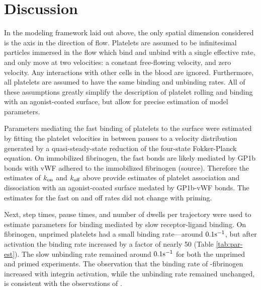 \documentclass{biophys-new}
\newcommand{\tn}{\textnormal}
\newcommand{\inv}{^{-1}}
\begin{document}
\section*{Discussion}

In the modeling framework laid out above, the only spatial dimension
considered is the axis in the direction of flow. Platelets are assumed
to be infinitesimal particles immersed in the flow which bind and
unbind with a single effective rate, and only move at two velocities:
a constant free-flowing velocity, and zero velocity. Any interactions
with other cells in the blood are ignored. Furthermore, all platelets
are assumed to have the same binding and unbinding rates. All of these
assumptions greatly simplify the description of platelet rolling and
binding with an agonist-coated surface, but allow for precise
estimation of model parameters.

Parameters mediating the fast binding of platelets to the surface were
estimated by fitting the platelet velocities in between pauses to a
velocity distribution generated by a quasi-steady-state reduction of
the four-state Fokker-Planck equation. On immobilized fibrinogen, the
fast bonds are likely mediated by GP1b bonds with vWF adhered to the
immobilized fibrinogen (source). Therefore the estimates of
$k_\textnormal{on}$ and $k_\textnormal{off}$ above provide estimates of platelet
association and dissociation with an agonist-coated surface medated by
GP1b-vWF bonds. The estimates for the fast on and off rates did not
change with priming.

Next, step times, pause times, and number of dwells per trajectory
were used to estimate parameters for binding mediated by slow
receptor-ligand binding. On fibrinogen, unprimed platelets had a small
binding rate---around $0.1 \tn{s}\inv$, but after activation the
binding rate increased by a factor of nearly 50 (Table
\ref{tab:par-est}). The slow unbinding rate remained around
$0.1 \tn{s}\inv$ for both the unprimed and primed experiments. The
observation that the binding rate of -fibrinogen
increased with integrin activation, while the unbinding rate remained
unchanged, is consistent with the observations of \cite{Litvinov2012}.



\end{document}
